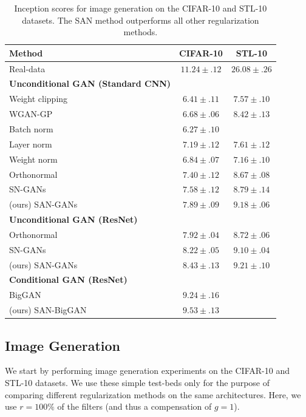 \documentclass[letterpaper]{article} %
\begin{document}
\addtolength{\tabcolsep}{3pt}
\begin{table}[t]
\begin{center}
\begin{tabular}{p{3cm} c c}
Method & CIFAR-10 & STL-10 \\ \hline \hline
Real-data & $11.24\pm .12$ & $26.08\pm .26$ \\ \hline
\textbf{Unconditional GAN (Standard CNN)} && \\
Weight clipping & $6.41\pm .11$ & $7.57 \pm .10$ \\
WGAN-GP & $ 6.68\pm .06$ & $ 8.42\pm .13$\\
Batch norm & $ 6.27 \pm .10$ &  \\
Layer norm & $ 7.19 \pm .12$ & $ 7.61\pm .12$\\
Weight norm & $6.84 \pm .07$ & $ 7.16\pm .10$\\
Orthonormal & $7.40 \pm .12$ & $8.67 \pm .08$\\
SN-GANs & $7.58 \pm .12$ & $8.79 \pm .14$\\
(ours) SAN-GANs & $\mathbf{7.89} \pm .09$ &  $\mathbf{9.18} \pm .06$\\ \hline
\textbf{Unconditional GAN (ResNet)} && \\
Orthonormal & $7.92 \pm .04$ & $8.72 \pm .06$ \\
SN-GANs & $8.22 \pm .05$ & $9.10 \pm .04$\\
(ours) SAN-GANs & $\mathbf{8.43} \pm .13$ & $\mathbf{9.21} \pm .10$\\  \hline
\textbf{Conditional GAN (ResNet)} &  & \\
BigGAN & $9.24 \pm .16$ & \\
(ours) SAN-BigGAN & $\mathbf{9.53} \pm .13$ & \\

\end{tabular}
\end{center}
\caption{Inception scores for image generation on the CIFAR-10 and STL-10 datasets. The SAN method outperforms all other regularization methods.}
\label{tab:generation}
\end{table}
\addtolength{\tabcolsep}{-3pt}

\subsection{Image Generation}\label{image_generation}
We start by performing image generation experiments on the CIFAR-10 \cite{cifar} and STL-10 \cite{stl} datasets. We use these simple test-beds only for the purpose of comparing different regularization methods on the same architectures. Here, we use $r=100\%$ of the filters (and thus a compensation of $g=1$).
\end{document}
